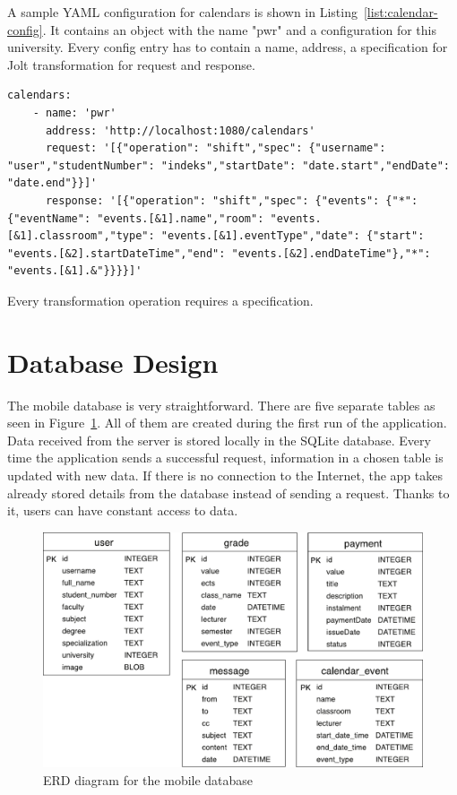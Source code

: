 A sample YAML configuration for calendars is shown in Listing~\ref{list:calendar-config}. It contains an object with the name "pwr" and a configuration for this university. Every config entry has to contain a name, address, a specification for Jolt transformation for request and response.

\begin{lstlisting}[label=list:calendar-config,caption=Sample YAML configuration for calendars, basicstyle=\footnotesize\ttfamily, breaklines=true]
calendars:
    - name: 'pwr'
      address: 'http://localhost:1080/calendars'
      request: '[{"operation": "shift","spec": {"username": "user","studentNumber": "indeks","startDate": "date.start","endDate": "date.end"}}]'
      response: '[{"operation": "shift","spec": {"events": {"*": {"eventName": "events.[&1].name","room": "events.[&1].classroom","type": "events.[&1].eventType","date": {"start": "events.[&2].startDateTime","end": "events.[&2].endDateTime"},"*": "events.[&1].&"}}}}]'
\end{lstlisting}

Every transformation operation requires a specification.


\section{Database Design}
The mobile database is very straightforward. There are five separate tables as seen in Figure~\ref{fig:erd-diagram}. All of them are created during the first run of the application. Data received from the server is stored locally in the SQLite database. Every time the application sends a successful request, information in a chosen table is updated with new data. If there is no connection to the Internet, the app takes already stored details from the database instead of sending a request. Thanks to it, users can have constant access to data.
\begin{figure}[htb]
    \centering
    \includegraphics[scale=0.7]{fig03/erd_diagram-01.pdf}
    \caption{ERD diagram for the mobile database}
    \label{fig:erd-diagram}
\end{figure}

